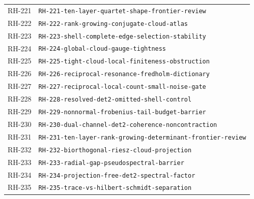 \begin{longtable}{r >{\raggedright\arraybackslash}p{}}
RH-221 & \texttt{RH-\allowbreak{}221-\allowbreak{}ten-\allowbreak{}layer-\allowbreak{}quartet-\allowbreak{}shape-\allowbreak{}frontier-\allowbreak{}review}\\
RH-222 & \texttt{RH-\allowbreak{}222-\allowbreak{}rank-\allowbreak{}growing-\allowbreak{}conjugate-\allowbreak{}cloud-\allowbreak{}atlas}\\
RH-223 & \texttt{RH-\allowbreak{}223-\allowbreak{}shell-\allowbreak{}complete-\allowbreak{}edge-\allowbreak{}selection-\allowbreak{}stability}\\
RH-224 & \texttt{RH-\allowbreak{}224-\allowbreak{}global-\allowbreak{}cloud-\allowbreak{}gauge-\allowbreak{}tightness}\\
RH-225 & \texttt{RH-\allowbreak{}225-\allowbreak{}tight-\allowbreak{}cloud-\allowbreak{}local-\allowbreak{}finiteness-\allowbreak{}obstruction}\\
RH-226 & \texttt{RH-\allowbreak{}226-\allowbreak{}reciprocal-\allowbreak{}resonance-\allowbreak{}fredholm-\allowbreak{}dictionary}\\
RH-227 & \texttt{RH-\allowbreak{}227-\allowbreak{}reciprocal-\allowbreak{}local-\allowbreak{}count-\allowbreak{}small-\allowbreak{}noise-\allowbreak{}gate}\\
RH-228 & \texttt{RH-\allowbreak{}228-\allowbreak{}resolved-\allowbreak{}det2-\allowbreak{}omitted-\allowbreak{}shell-\allowbreak{}control}\\
RH-229 & \texttt{RH-\allowbreak{}229-\allowbreak{}nonnormal-\allowbreak{}frobenius-\allowbreak{}tail-\allowbreak{}budget-\allowbreak{}barrier}\\
RH-230 & \texttt{RH-\allowbreak{}230-\allowbreak{}dual-\allowbreak{}channel-\allowbreak{}det2-\allowbreak{}coherence-\allowbreak{}noncontraction}\\
RH-231 & \texttt{RH-\allowbreak{}231-\allowbreak{}ten-\allowbreak{}layer-\allowbreak{}rank-\allowbreak{}growing-\allowbreak{}determinant-\allowbreak{}frontier-\allowbreak{}review}\\
RH-232 & \texttt{RH-\allowbreak{}232-\allowbreak{}biorthogonal-\allowbreak{}riesz-\allowbreak{}cloud-\allowbreak{}projection}\\
RH-233 & \texttt{RH-\allowbreak{}233-\allowbreak{}radial-\allowbreak{}gap-\allowbreak{}pseudospectral-\allowbreak{}barrier}\\
RH-234 & \texttt{RH-\allowbreak{}234-\allowbreak{}projection-\allowbreak{}free-\allowbreak{}det2-\allowbreak{}spectral-\allowbreak{}factor}\\
RH-235 & \texttt{RH-\allowbreak{}235-\allowbreak{}trace-\allowbreak{}vs-\allowbreak{}hilbert-\allowbreak{}schmidt-\allowbreak{}separation}\\

\end{longtable}
